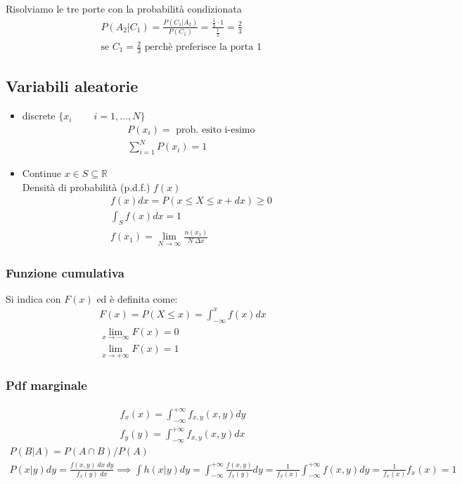 \documentclass[a4paper, oneside]{article}
\begin{document}
Risolviamo le tre porte con la probabilità condizionata\\
\begin{gather*}
    P(A_2|C_1) = \frac{P(C_1|A_2)}{P(C_1)} = \frac{\frac{1}{3} \cdot 1}{\frac{1}{2}} = \frac{2}{3}\\
    \text{se } C_1 = \frac{2}{3} \text{ perchè preferisce la porta 1 }
\end{gather*}

\subsection{Variabili aleatorie}
\begin{itemize}
    \item discrete $\{x_i\ \qquad i = 1, \dots , N\}$
\begin{gather*}
    P(x_i) = \text{ prob. esito i-esimo}\\
    \sum_{i=1}^{N} P(x_i) = 1
\end{gather*}
    \item Continue $x \in S \subseteq \mathbb{R}$\\
    Densità di probabilità (p.d.f.) $f(x)$
    \begin{gather*}
        f(x) dx = P(x \leq X \leq x + dx) \geq 0\\
        \int_{S} f(x) dx = 1\\
        f(x_1) = \lim_{N \to \infty} \frac{n(x_1)}{N \ \Delta x}
    \end{gather*}
\end{itemize}

\subsubsection{Funzione cumulativa}
Si indica con $F(x)$ ed è definita come:
\begin{gather*}
    F(x) = P(X \leq x) = \int_{-\infty}^{x} f(x) dx\\
    \lim_{x \to -\infty} F(x) = 0\\
    \lim_{x \to +\infty} F(x) = 1
\end{gather*}

\subsubsection{Pdf marginale}
\begin{gather*}
    f_x(x) = \int_{-\infty}^{+\infty} f_{x,y}(x,y) dy\\
    f_y(y) = \int_{-\infty}^{+\infty} f_{x,y}(x,y) dx
\end{gather*}
\begin{gather*}
    P(B|A) = P(A \cap B) / P(A)\\
    P(x|y) dy = \frac{f(x,y) \ dx \ dy}{f_x(y) \ dx} \implies \int h(x|y) dy = \int_{-\infty}^{+\infty} \frac{f(x,y)}{f_x(y)} dy = \frac{1}{f_x(x)} \int_{-\infty}^{+\infty} f(x,y) dy = \frac{1}{f_x(x)} f_x(x) = 1
\end{gather*}
\end{document}
